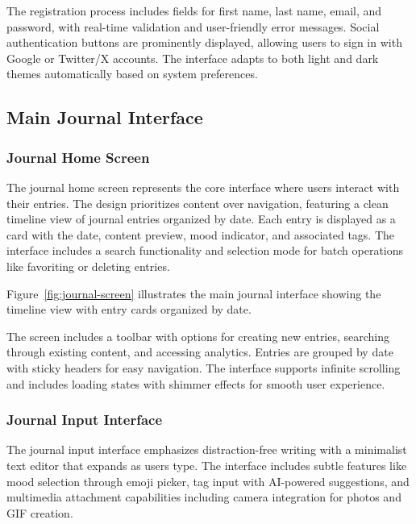 The registration process includes fields for first name, last name, email, and password, with real-time validation and user-friendly error messages. Social authentication buttons are prominently displayed, allowing users to sign in with Google or Twitter/X accounts. The interface adapts to both light and dark themes automatically based on system preferences.

\subsection{Main Journal Interface}

\subsubsection{Journal Home Screen}

The journal home screen represents the core interface where users interact with their entries. The design prioritizes content over navigation, featuring a clean timeline view of journal entries organized by date. Each entry is displayed as a card with the date, content preview, mood indicator, and associated tags. The interface includes a search functionality and selection mode for batch operations like favoriting or deleting entries.

Figure~\ref{fig:journal-screen} illustrates the main journal interface showing the timeline view with entry cards organized by date.


The screen includes a toolbar with options for creating new entries, searching through existing content, and accessing analytics. Entries are grouped by date with sticky headers for easy navigation. The interface supports infinite scrolling and includes loading states with shimmer effects for smooth user experience.

\subsubsection{Journal Input Interface}

The journal input interface emphasizes distraction-free writing with a minimalist text editor that expands as users type. The interface includes subtle features like mood selection through emoji picker, tag input with AI-powered suggestions, and multimedia attachment capabilities including camera integration for photos and GIF creation.

